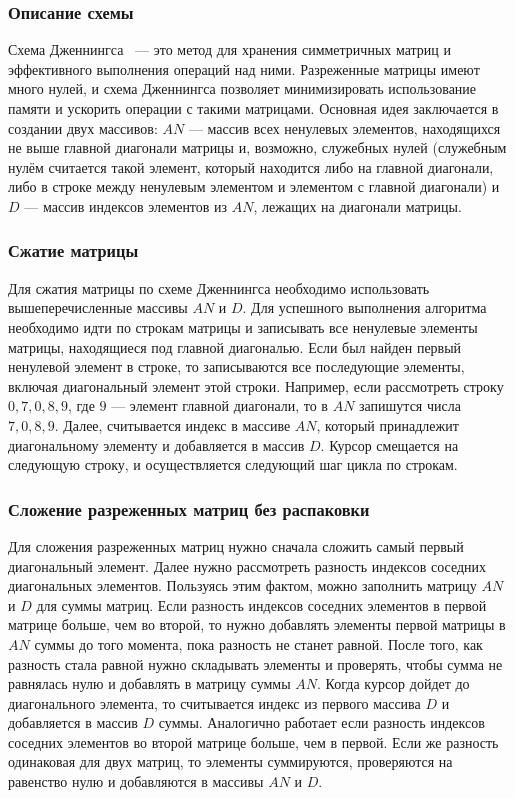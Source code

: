 \documentclass[12pt, a4paper]{article}
\begin{document}
\subsubsection{Описание схемы}
Схема Дженнингса~\cite{book} --- это метод для хранения симметричных матриц и эффективного выполнения операций над ними. Разреженные матрицы имеют много нулей, и схема Дженнингса позволяет минимизировать использование памяти и ускорить операции с такими матрицами. Основная идея заключается в создании двух массивов:  $AN$ --- массив всех ненулевых элементов, находящихся не выше главной диагонали матрицы и, возможно, служебных нулей (служебным нулём считается такой элемент, который находится либо на главной диагонали, либо в строке между ненулевым элементом и элементом с главной диагонали) и $D$ --- массив индексов элементов из $AN$, лежащих на диагонали матрицы.
\subsubsection{Сжатие матрицы}
Для сжатия матрицы по схеме Дженнингса необходимо использовать вышеперечисленные массивы $AN$ и $D$. Для успешного выполнения алгоритма необходимо идти по строкам матрицы и записывать все ненулевые элементы матрицы, находящиеся под главной диагональю. Если был найден первый ненулевой элемент в строке, то записываются все последующие элементы, включая диагональный элемент этой строки. Например, если рассмотреть строку $0, 7, 0, 8, 9$, где $9$ --- элемент главной диагонали, то в $AN$ запишутся числа $7, 0, 8, 9$. Далее, считывается индекс в массиве $AN$, который принадлежит диагональному элементу и добавляется в массив $D$. Курсор смещается на следующую строку, и осуществляется следующий шаг цикла по строкам.

\subsubsection{Сложение разреженных матриц без распаковки}
Для сложения разреженных матриц нужно сначала сложить самый первый диагональный элемент. Далее нужно рассмотреть разность индексов соседних диагональных элементов. Пользуясь этим фактом, можно заполнить матрицу $AN$ и $D$ для суммы матриц. Если разность индексов соседних элементов в первой матрице больше, чем во второй, то нужно добавлять элементы первой матрицы в $AN$ суммы до того момента, пока разность не станет равной. После того, как разность стала равной нужно складывать элементы и проверять, чтобы сумма не равнялась нулю и добавлять в матрицу суммы $AN$. Когда курсор дойдет до диагонального элемента, то считывается индекс из первого массива $D$ и добавляется в массив $D$ суммы. Аналогично работает если разность индексов соседних элементов во второй матрице больше, чем в первой. Если же разность одинаковая для двух матриц, то элементы суммируются, проверяются на равенство нулю и добавляются в массивы $AN$ и $D$. 
\end{document}
